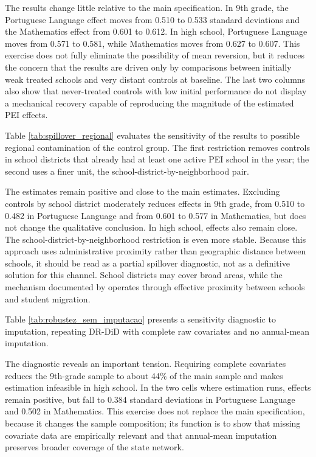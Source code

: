 

The results change little relative to the main specification. In 9th grade, the Portuguese Language effect moves from 0.510 to 0.533 standard deviations and the Mathematics effect from 0.601 to 0.612. In high school, Portuguese Language moves from 0.571 to 0.581, while Mathematics moves from 0.627 to 0.607. This exercise does not fully eliminate the possibility of mean reversion, but it reduces the concern that the results are driven only by comparisons between initially weak treated schools and very distant controls at baseline. The last two columns also show that never-treated controls with low initial performance do not display a mechanical recovery capable of reproducing the magnitude of the estimated PEI effects.

Table \ref{tab:spillover_regional} evaluates the sensitivity of the results to possible regional contamination of the control group. The first restriction removes controls in school districts that already had at least one active PEI school in the year; the second uses a finer unit, the school-district-by-neighborhood pair.



The estimates remain positive and close to the main estimates. Excluding controls by school district moderately reduces effects in 9th grade, from 0.510 to 0.482 in Portuguese Language and from 0.601 to 0.577 in Mathematics, but does not change the qualitative conclusion. In high school, effects also remain close. The school-district-by-neighborhood restriction is even more stable. Because this approach uses administrative proximity rather than geographic distance between schools, it should be read as a partial spillover diagnostic, not as a definitive solution for this channel. School districts may cover broad areas, while the mechanism documented by \textcite{santos2022_spillover_pei_escolas_regulares} operates through effective proximity between schools and student migration.

Table \ref{tab:robustez_sem_imputacao} presents a sensitivity diagnostic to imputation, repeating DR-DiD with complete raw covariates and no annual-mean imputation.



The diagnostic reveals an important tension. Requiring complete covariates reduces the 9th-grade sample to about 44\% of the main sample and makes estimation infeasible in high school. In the two cells where estimation runs, effects remain positive, but fall to 0.384 standard deviations in Portuguese Language and 0.502 in Mathematics. This exercise does not replace the main specification, because it changes the sample composition; its function is to show that missing covariate data are empirically relevant and that annual-mean imputation preserves broader coverage of the state network.


